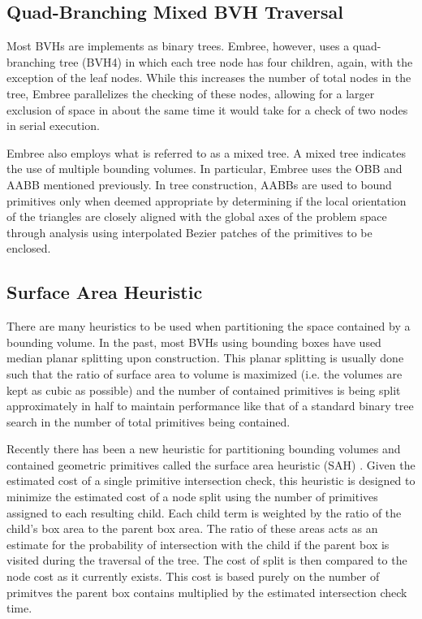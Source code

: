 \documentclass{anstrans}
\begin{document}
\subsection{Quad-Branching Mixed BVH Traversal}

Most BVHs are implements as binary trees. Embree, however, uses a quad-branching tree (BVH4) in which each tree node has four children, again, with the exception of the leaf nodes. While this increases the number of total nodes in the tree, Embree parallelizes the checking of these nodes, allowing for a larger exclusion of space in about the same time it would take for a check of two nodes in serial execution. 

Embree also employs what is referred to as a mixed tree. A mixed tree indicates the use of multiple bounding volumes. In particular, Embree uses the OBB and AABB mentioned previously. In tree construction, AABBs are used to bound primitives only when deemed appropriate by determining if the local orientation of the triangles are closely aligned with the global axes of the problem space through analysis using interpolated Bezier patches of the primitives to be enclosed.

\subsection{Surface Area Heuristic}

There are many heuristics to be used when partitioning the space contained by a bounding volume. In the past, most BVHs using bounding boxes have used median planar splitting upon construction. This planar splitting is usually done such that the ratio of surface area to volume is maximized (i.e. the volumes are kept as cubic as possible) and the number of contained primitives is being split approximately in half to maintain performance like that of a standard binary tree search in the number of total primitives being contained. 

Recently there has been a new heuristic for partitioning bounding volumes and contained geometric primitives called the surface area heuristic (SAH) \cite{sah}. Given the estimated cost of a single primitive intersection check, this heuristic is designed to minimize the estimated cost of a node split using the number of primitives assigned to each resulting child. Each child term is weighted by the ratio of the child's box area to the parent box area. The ratio of these areas acts as an estimate for the probability of intersection with the child if the parent box is visited during the traversal of the tree. The cost of split is then compared to the node cost as it currently exists. This cost is based purely on the number of primitves the parent box contains multiplied by the estimated intersection check time.
\end{document}
